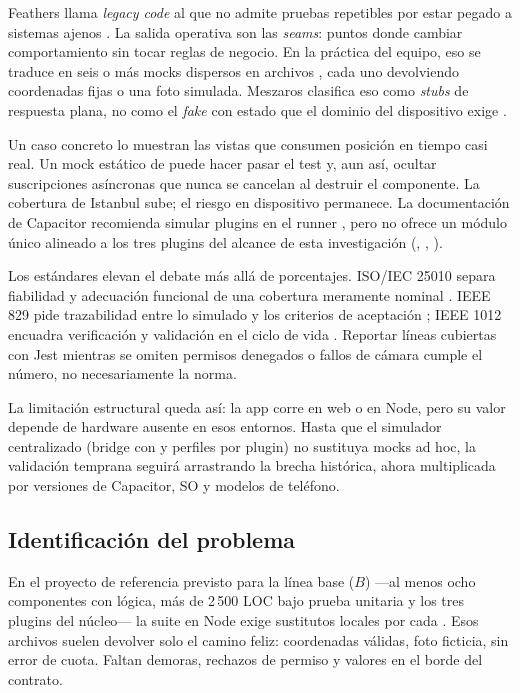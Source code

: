 Feathers llama \textit{legacy code} al que no admite pruebas repetibles por estar pegado a sistemas ajenos \cite{feathers2004working}. La salida operativa son las \textit{seams}: puntos donde cambiar comportamiento sin tocar reglas de negocio. En la práctica del equipo, eso se traduce en seis o más mocks dispersos en archivos , cada uno devolviendo coordenadas fijas o una foto simulada. Meszaros clasifica eso como \textit{stubs} de respuesta plana, no como el \textit{fake} con estado que el dominio del dispositivo exige \cite{meszaros2007xunit}.

Un caso concreto lo muestran las vistas que consumen posición en tiempo casi real. Un mock estático de  puede hacer pasar el test y, aun así, ocultar suscripciones asíncronas que nunca se cancelan al destruir el componente. La cobertura de Istanbul sube; el riesgo en dispositivo permanece. La documentación de Capacitor recomienda simular plugins en el runner \cite{capacitor2024testing}, pero no ofrece un módulo único alineado a los tres plugins del alcance de esta investigación (, , ).

Los estándares elevan el debate más allá de porcentajes. ISO/IEC 25010 separa fiabilidad y adecuación funcional de una cobertura meramente nominal \cite{iso250102011}. IEEE 829 pide trazabilidad entre lo simulado y los criterios de aceptación \cite{ieee8292008}; IEEE 1012 encuadra verificación y validación en el ciclo de vida \cite{ieee10122012}. Reportar líneas cubiertas con Jest mientras se omiten permisos denegados o fallos de cámara cumple el número, no necesariamente la norma.

La limitación estructural queda así: la app corre en web o en Node, pero su valor depende de hardware ausente en esos entornos. Hasta que el simulador centralizado (bridge con  y perfiles por plugin) no sustituya mocks ad hoc, la validación temprana seguirá arrastrando la brecha histórica, ahora multiplicada por versiones de Capacitor, SO y modelos de teléfono.

\subsection{Identificación del problema}
\label{sec:identificacion_problema}

En el proyecto de referencia previsto para la línea base ($B$) ---al menos ocho componentes con lógica, más de 2\,500 LOC bajo prueba unitaria y los tres plugins del núcleo--- la suite en Node exige sustitutos locales por cada . Esos archivos suelen devolver solo el camino feliz: coordenadas válidas, foto ficticia,  sin error de cuota. Faltan demoras, rechazos de permiso y valores en el borde del contrato.

